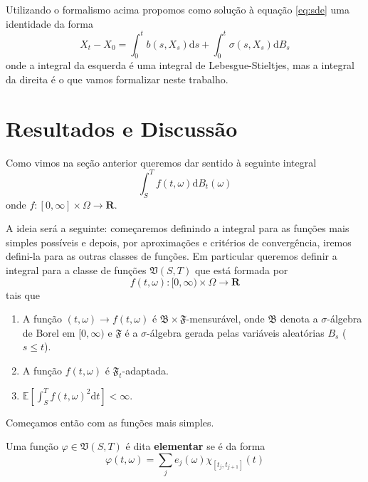 \documentclass[portrait]{a0poster}	%
\theoremstyle{definition}
\begin{document}
\begin{multicols}{2}
    Utilizando o formalismo acima propomos como solução à equação \eqref{eq:sde} uma identidade da forma
    \begin{equation}\label{eq:sde-sol-prop}
        X_t - X_0 = \int_0^t b(s, X_s) \mathrm{d}s + \int_0^t \sigma(s, X_s) \mathrm{d}B_s
    \end{equation}
    onde a integral da esquerda é uma integral de Lebesgue-Stieltjes, mas a integral da direita é o que vamos formalizar neste trabalho. 

    \section*{Resultados e Discussão}

    Como vimos na seção anterior queremos dar sentido à seguinte integral
    \begin{equation}\label{eq:gen_ito_integrand}
        \int_S^T f(t, \omega) \mathrm{d}B_t(\omega)
    \end{equation}
    onde $f : [0, \infty] \times \Omega \longrightarrow \textbf{R}$.

    A ideia será a seguinte: começaremos definindo a integral para as funções mais simples possíveis e depois, por aproximações e critérios de convergência, iremos defini-la para as outras classes de funções. Em particular queremos definir a integral para   a classe de funções  $\mathfrak{V}(S,T)$ que está formada por 
        \[
            f(t, \omega) : [0, \infty) \times \Omega \longrightarrow \textbf{R}
        \]
        tais que
        \begin{enumerate}
            \item A função $(t, \omega) \longrightarrow f(t, \omega)$ é $\mathfrak{B} \times \mathfrak{F}$-mensurável, onde $\mathfrak{B}$ denota a $\sigma$-álgebra de Borel em $[0, \infty)$ e $\mathfrak{F}$ é a $\sigma$-álgebra gerada pelas variáveis aleatórias $B_s$ ($s \leq t$).
            \item A função $f(t,\omega)$ é $\mathfrak{F}_t$-adaptada.
            \item $\mathbb{E} \left[ \int_S^T f(t, \omega)^2 \mathrm{d}t \right] < \infty$.
        \end{enumerate}

    Começamos então com as funções mais simples. 
    \begin{definition}
            Uma função $\varphi \in \mathfrak{V}(S,T)$ é dita \textbf{elementar} se é da forma
        \begin{equation}
            \varphi(t, \omega) = \sum_j e_j(\omega) \chi_{[t_j, t_{j+1}]}(t)
        \end{equation}
    \end{definition}


\end{multicols}
\end{document}
